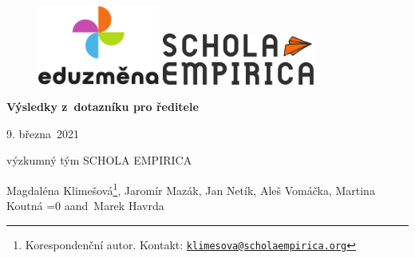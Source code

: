 \documentclass[12pt,a4paper,]{report}
\newcommand{\tr}[2]{\ifnum\pdfstrcmp{\languagename}{czech}=0 #1\else #2\fi}
\begin{document}
\begin{titlepage}
    \begin{center}

    \onehalfspacing

      \vspace*{1cm}

      \begin{figure}
      \centering
            \includegraphics[width=4cm]{logos/eduzmena}%
      \hspace{1.5cm}%
            \includegraphics[width=5cm]{logos/scholaLogoNew3}%
      \end{figure}

      \vspace{1cm}

      \textbf{\huge Výsledky z~dotazníku pro ředitele}

      \vspace{.25cm}

      \textit{\Large }

      \vspace{1cm}

      \large

      9. března~2021

      \vspace{1cm}

      výzkumný tým SCHOLA EMPIRICA

      \vspace{.25cm}

            Magdaléna Klimešová\footnote{Korespondenční autor. Kontakt: \href{mailto:klimesova@scholaempirica.org}{\nolinkurl{klimesova@scholaempirica.org}}}, Jaromír Mazák, Jan Netík, Aleš Vomáčka, Martina Koutná \tr{a}{and}~Marek Havrda
      
      
      \vspace{1.5cm}

    \end{center}
\end{titlepage}
\end{document}
